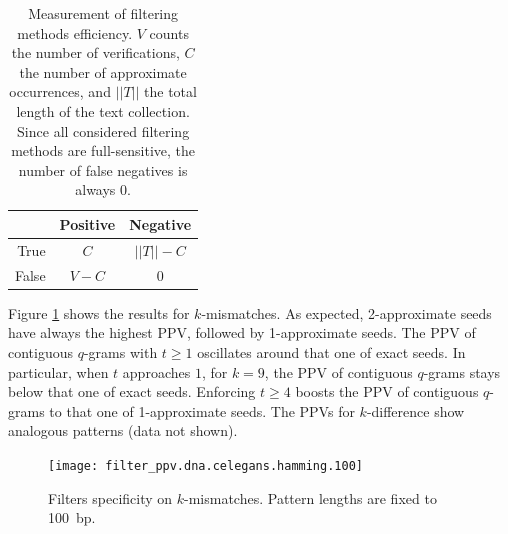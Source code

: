 \begin{table}[t]
\begin{center}
\caption[Measurement of filtering methods efficiency]{Measurement of filtering methods efficiency. $V$ counts the number of verifications, $C$ the number of approximate occurrences, and $||T||$ the total length of the text collection. Since all considered filtering methods are full-sensitive, the number of false negatives is always 0.}
\begin{tabular}{rcc}
\toprule
  & Positive & Negative\\
\midrule
True & $C$ & $||T|| - C$ \\
False & $V - C$ & 0		\\
\bottomrule
\end{tabular}
\label{tab:filter:ppv}
\end{center}
\end{table}

Figure \ref{fig:filter-ppv-hamming-celegans} shows the results for $k$-mismatches.
As expected, 2-approximate seeds have always the highest PPV, followed by 1-approximate seeds.
The PPV of contiguous $q$-grams with $t \geq 1$ oscillates around that one of exact seeds.
In particular, when $t$ approaches $1$, \eg for $k = 9$, the PPV of contiguous $q$-grams stays below that one of exact seeds.
Enforcing $t \geq 4$ boosts the PPV of contiguous $q$-grams to that one of 1-approximate seeds.
The PPVs for $k$-difference show analogous patterns (data not shown).

\begin{figure}[h]
\begin{center}
\caption[Filters specificity on $k$-mismatches]{Filters specificity on $k$-mismatches. Pattern lengths are fixed to 100~bp.}
\label{fig:filter-ppv-hamming-celegans}
\texttt{[image: filter\_ppv.dna.celegans.hamming.100]}
\end{center}
\end{figure}

